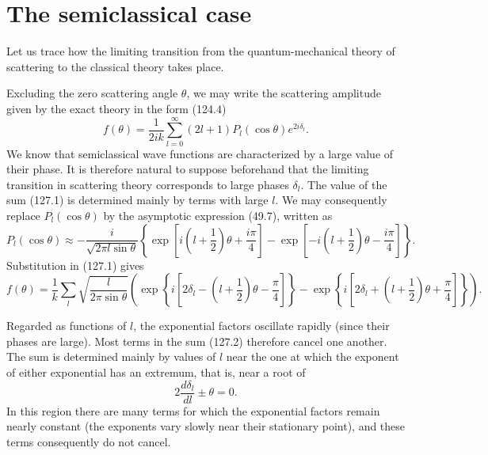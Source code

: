 \section{The semiclassical case}

Let us trace how the limiting transition from the quantum-mechanical theory
of scattering to the classical theory takes place.

Excluding the zero scattering angle $\theta$, we may write the scattering
amplitude given by the exact theory in the form (124.4)
\begin{equation}
 f(\theta)=\frac1{2ik}\sum_{l=0}^{\infty}(2l+1)P_l(\cos\theta)e^{2i\delta_l}.
 \tag{127.1}
\end{equation}
We know that semiclassical wave functions are characterized by a large value
of their phase. It is therefore natural to suppose beforehand that the
limiting transition in scattering theory corresponds to large phases
$\delta_l$. The value of the sum (127.1) is determined mainly by terms with
large $l$. We may consequently replace $P_l(\cos\theta)$ by the asymptotic
expression (49.7), written as
\[
 P_l(\cos\theta)\approx-\frac{i}{\sqrt{2\pi l\sin\theta}}
 \left\{\exp\left[i\left(l+\frac12\right)\theta+\frac{i\pi}4\right]
 -\exp\left[-i\left(l+\frac12\right)\theta-\frac{i\pi}4\right]\right\}.
\]
Substitution in (127.1) gives
\begingroup\small
\begin{equation}
 f(\theta)=\frac1k\sum_l\sqrt{\frac{l}{2\pi\sin\theta}}
 \left(\exp\left\{i\left[2\delta_l-\left(l+\frac12\right)\theta-\frac\pi4\right]\right\}
 -\exp\left\{i\left[2\delta_l+\left(l+\frac12\right)\theta+\frac\pi4\right]\right\}\right).
\tag{127.2}
\end{equation}
\endgroup

Regarded as functions of $l$, the exponential factors oscillate rapidly
(since their phases are large). Most terms in the sum (127.2) therefore
cancel one another. The sum is determined mainly by values of $l$ near the
one at which the exponent of either exponential has an extremum, that is,
near a root of
\begin{equation}
 2\frac{d\delta_l}{dl}\pm\theta=0.
 \tag{127.3}
\end{equation}
In this region there are many terms for which the exponential factors remain
nearly constant (the exponents vary slowly near their stationary point), and
these terms consequently do not cancel.

